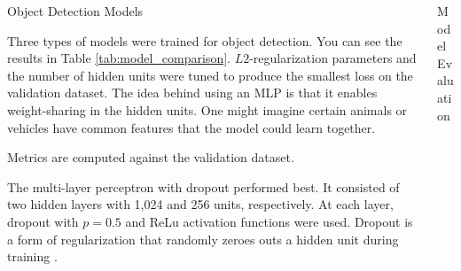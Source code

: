\documentclass[final]{beamer}
\newlength{\onecolwid}
\newlength{\twocolwid}
\begin{document}
\begin{frame}[t]
\begin{columns}[t]
\begin{column}{\twocolwid}
\begin{columns}[t,totalwidth=\twocolwid]
\begin{column}{\onecolwid}\vspace{-.6in} %


\begin{block}{Object Detection Models}

  Three types of models were trained for object detection. You can see the
  results in Table \ref{tab:model_comparison}. $L2$-regularization parameters
  and the number of hidden units were tuned to produce the smallest loss on the
  validation dataset. The idea behind using an MLP is that it enables
  weight-sharing in the hidden units. One might imagine certain animals or
  vehicles have common features that the model could learn together.

  \begin{table}
    \centering
    
    \caption{Metrics are computed against the validation dataset.}
    \label{tab:model_comparison}    
  \end{table}

  The multi-layer perceptron with dropout performed best. It consisted of two
  hidden layers with 1,024 and 256 units, respectively. At each layer, dropout
  with $p = 0.5$ and ReLu activation functions were used. Dropout is a form of
  regularization that randomly zeroes outs a hidden unit during training
  \citep{dropout}.
\end{block}



\end{column} %

\begin{column}{\onecolwid}\vspace{-.6in} %


\begin{block}{Model Evaluation}


\end{block}
\end{column}
\end{columns}
\end{column}
\end{columns}
\end{frame}
\end{document}
